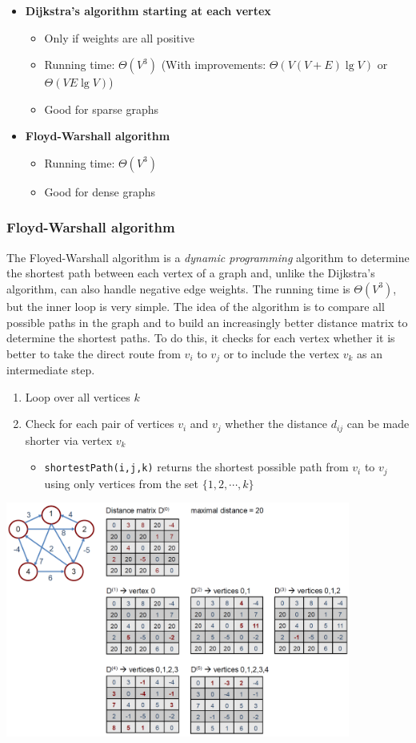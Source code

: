\begin{itemize}
    \item \textbf{Dijkstra's algorithm starting at each vertex}
    \begin{itemize}
        \item Only if weights are all positive
        \item Running time: $\Theta(V^3)$ (With improvements: $\Theta(V(V+E)\lg V)$ or $\Theta(VE\lg V)$)
        \item Good for sparse graphs
    \end{itemize}
    \item \textbf{Floyd-Warshall algorithm}
    \begin{itemize}
        \item Running time: $\Theta(V^3)$
        \item Good for dense graphs
    \end{itemize}
\end{itemize}

\subsubsection{Floyd-Warshall algorithm}

The Floyed-Warshall algorithm is a \emph{dynamic programming} algorithm to determine the shortest path between each vertex of a graph and, unlike the Dijkstra's algorithm, can also handle negative edge weights. The running time is $\Theta(V^3)$, but the inner loop is very simple. The idea of the algorithm is to compare all possible paths in the graph and to build an increasingly better distance matrix to determine the shortest paths. To do this, it checks for each vertex whether it is better to take the direct route from $v_i$ to $v_j$ or to include the vertex $v_k$ as an intermediate step.

\begin{enumerate}
    \item Loop over all vertices $k$
    \item Check for each pair of vertices $v_i$ and $v_j$ whether the distance $d_{ij}$ can be made shorter via vertex $v_k$
    \begin{itemize}
        \item \lstinline|shortestPath(i,j,k)| returns the shortest possible path from $v_i$ to $v_j$ using only vertices from the set $\{1,2,\cdots,k\}$
    \end{itemize}
\end{enumerate}

\begin{center}\includegraphics[width=0.85\textwidth]{img/graphs/FloydWarshallGraph.png}\end{center}

%